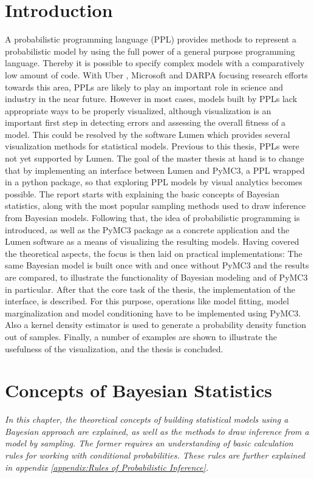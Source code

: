 \documentclass{article}
\begin{document}
\section{Introduction}
A probabilistic programming language (PPL) provides methods to represent a probabilistic model by using the full power of a general purpose programming language. Thereby it is possible to specify complex models with a comparatively low amount of code. With Uber \cite{bingham2018pyro}, Microsoft \cite{gordon2014probabilistic} and DARPA \cite{Hardesty2015} focusing research efforts towards this area, PPLs are likely to play an important role in science and industry in the near future.
However in most cases, models built by PPLs lack appropriate ways to be properly visualized, although visualization is an important first step in detecting errors and assessing the overall fitness of a model. This could be resolved by the software Lumen which provides several visualization methods for statistical models. Previous to this thesis, PPLs were not yet supported by Lumen. The goal of the master thesis at hand is to change that by implementing an interface between Lumen and PyMC3, a PPL wrapped in a python package, so that exploring PPL models by visual analytics becomes possible. The report starts with explaining the basic concepts of Bayesian statistics, along with the most popular sampling methods used to draw inference from Bayesian models. Following that, the idea of probabilistic programming is introduced, as well as the PyMC3 package as a concrete application and the Lumen software as a means of visualizing the resulting models. Having covered the theoretical aspects, the focus is then laid on practical implementations: The same Bayesian model is built once with and once without PyMC3 and the results are compared, to illustrate the functionality of Bayesian modeling and of PyMC3 in particular. After that the core task of the thesis, the implementation of the interface, is described. For this purpose, operations like model fitting, model marginalization and model conditioning have to be implemented using PyMC3. Also a kernel density estimator is used to generate a probability density function out of samples. Finally, a number of examples are shown to illustrate the usefulness of the visualization, and the thesis is concluded.
\section{Concepts of Bayesian Statistics}
\textit{In this chapter, the theoretical concepts of building statistical models using a Bayesian approach are explained, as well as the methods to draw inference from a model by sampling. The former requires an understanding of basic calculation rules for working with conditional probabilities. These rules are further explained in appendix \ref{appendix:Rules of Probabilistic Inference}.}
\end{document}
